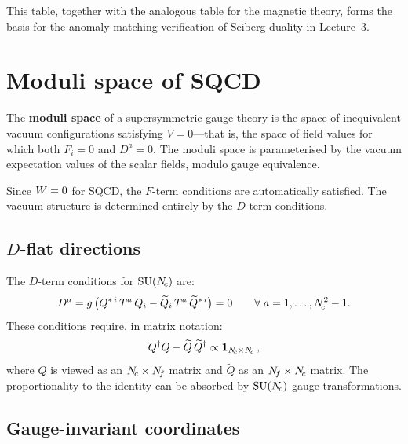 \documentclass[11pt,a4paper]{article}
\begin{document}
\noindent This table, together with the analogous table for the magnetic
theory, forms the basis for the anomaly matching verification of
Seiberg duality in Lecture~3.


\section{Moduli space of SQCD}
\label{sec:moduli}

\begin{definition}
\label{def:moduli}
The \textbf{moduli space} of a supersymmetric gauge theory is the space
of inequivalent vacuum configurations satisfying $V = 0$---that is,
the space of field values for which both $F_i = 0$ and $D^a = 0$.
The moduli space is parameterised by the vacuum expectation values of
the scalar fields, modulo gauge equivalence.
\end{definition}

Since $W = 0$ for SQCD, the $F$-term conditions are automatically
satisfied.  The vacuum structure is determined entirely by the $D$-term
conditions.

\subsection{$D$-flat directions}
\label{sec:D-flat}

The $D$-term conditions for $\mathrm{SU}(N_{\!c})$ are:
\begin{equation}
  D^a = g\, \bigl(Q^{*\,i}\, T^a\, Q_i
  - \widetilde{Q}_i\, T^a\, \widetilde{Q}^{*\,i}\bigr) = 0
  \qquad \forall\; a = 1, \ldots, N_{\!c}^2 - 1.
  \label{eq:D-flat}
\end{equation}
These conditions require, in matrix notation:
\begin{equation}
  Q^\dagger Q - \widetilde{Q}\, \widetilde{Q}^\dagger
  \propto \mathbf{1}_{N_{\!c} \times N_{\!c}}\,,
  \label{eq:D-flat-matrix}
\end{equation}
where $Q$ is viewed as an $N_{\!c} \times N_{\!f}$ matrix and $\widetilde{Q}$
as an $N_{\!f} \times N_{\!c}$ matrix.  The proportionality to the identity
can be absorbed by $\mathrm{SU}(N_{\!c})$ gauge transformations.

\subsection{Gauge-invariant coordinates}
\label{sec:gauge-invariant}
\end{document}
